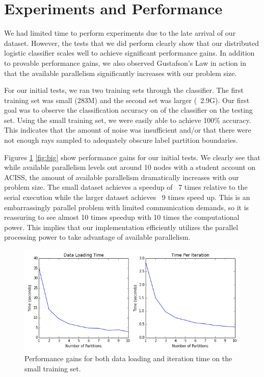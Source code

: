 \section{Experiments and Performance}
\label{experiments}
We had limited time to perform experiments due to the late arrival of our dataset.  However, the tests that we did perform clearly show that our distributed logistic classifier scales well to achieve significant performance gains.  In addition to provable performance gains, we also observed Gustafson's Law in action in that the available parallelism significantly increases with our problem size.

For our initial tests, we ran two training sets through the classifier.  The first training set was small (283M) and the second set was larger (~2.9G).  Our first goal was to observe the classification accuracy on of the classifier on the testing set.  Using the small training set, we were easily able to achieve 100\% accuracy.  This indicates that the amount of noise was insufficient and/or that there were not enough rays sampled to adequately obscure label partition boundaries.

Figures \ref{fig:small} \ref{fig:big} show performance gains for our initial tests.  We clearly see that while available parallelism levels out around 10 nodes with a student account on ACISS, the amount of available parallelism dramatically increases with our problem size.  The small dataset achieves a speedup of ~7 times relative to the serial execution while the larger dataset achieves ~9 times speed up.  This is an embarrassingly parallel problem with limited communication demands, so it is reassuring to see almost 10 times speedup with 10 times the computational power.  This implies that our implementation efficiently utilizes the parallel processing power to take advantage of available parallelism.

\begin{figure}[h]
\begin{center}
\includegraphics[scale=0.7]{small_metrics.png}
\caption{Performance gains for both data loading and iteration time on the small training set.}
\label{fig:small}
\end{center}
\end{figure}

